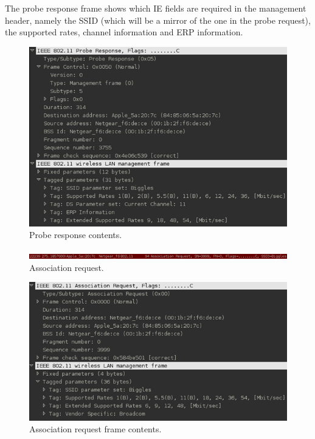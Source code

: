 The probe response frame shows which IE fields are required in the management header, namely the SSID (which will be a mirror of the one in the probe request), the supported rates, channel information and ERP information. 

\begin{figure}[htb!]
\includegraphics[width=\linewidth]{research/80211/figures/bt65.png}
\caption{Probe response contents.}
\label{research:80211:bt65}
\end{figure}


\begin{figure}[htb!]
\includegraphics[width=\linewidth]{research/80211/figures/bt7.png}
\caption{Association request.}
\label{research:80211:bt7}
\end{figure}

\begin{figure}[htb!]
\includegraphics[width=\linewidth]{research/80211/figures/bt8.png}
\caption{Association request frame contents.}
\label{research:80211:bt8}
\end{figure}
